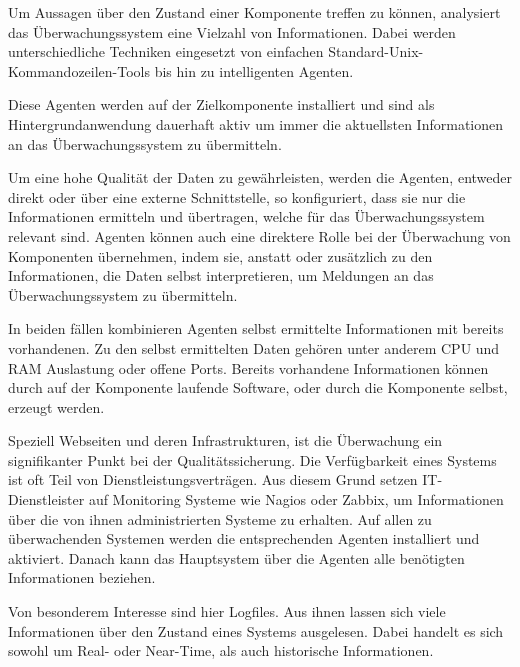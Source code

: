 Um Aussagen über den Zustand einer Komponente treffen zu können, analysiert das Überwachungssystem eine Vielzahl von Informationen. Dabei werden unterschiedliche Techniken eingesetzt von einfachen Standard-Unix-Kommandozeilen-Tools bis hin zu intelligenten Agenten.

Diese Agenten werden auf der Zielkomponente installiert und sind als Hintergrundanwendung dauerhaft aktiv um immer die aktuellsten Informationen an das Überwachungssystem zu übermitteln.

Um eine hohe Qualität der Daten zu gewährleisten, werden die Agenten, entweder direkt oder über eine externe Schnittstelle, so konfiguriert, dass sie nur die Informationen ermitteln und übertragen, welche für das Überwachungssystem relevant sind. Agenten können auch eine direktere Rolle bei der Überwachung von Komponenten übernehmen, indem sie, anstatt oder zusätzlich zu den Informationen, die Daten selbst interpretieren, um Meldungen an das Überwachungssystem zu übermitteln.

In beiden fällen kombinieren Agenten selbst ermittelte Informationen mit bereits vorhandenen. Zu den selbst ermittelten Daten gehören unter anderem CPU und RAM Auslastung oder offene Ports. Bereits vorhandene Informationen können durch auf der Komponente laufende Software, oder durch die Komponente selbst, erzeugt werden.

Speziell Webseiten und deren Infrastrukturen, ist die Überwachung ein signifikanter Punkt bei der Qualitätssicherung. Die Verfügbarkeit eines Systems ist oft Teil von Dienstleistungsverträgen. Aus diesem Grund setzen IT-Dienstleister auf Monitoring Systeme wie \gls{Nagios} oder \gls{Zabbix}, um Informationen über die von ihnen administrierten Systeme zu erhalten. Auf allen zu überwachenden Systemen werden die entsprechenden Agenten installiert und aktiviert. Danach kann das Hauptsystem über die Agenten alle benötigten Informationen beziehen.

Von besonderem Interesse sind hier Logfiles. Aus ihnen lassen sich viele Informationen über den Zustand eines Systems ausgelesen. Dabei handelt es sich sowohl um Real- oder Near-Time, als auch historische Informationen.


